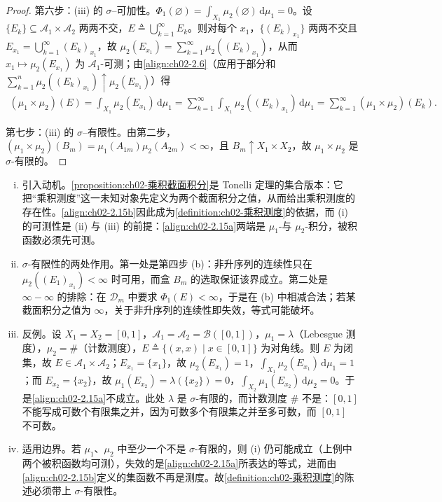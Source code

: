 \documentclass[../../main.tex]{subfiles}%
\begin{document}
\begin{proof}
第六步：(iii) 的 $\sigma$--可加性。$\Phi_1(\varnothing)=\int_{X_1}\mu_2(\varnothing)\,\mathrm{d}\mu_1=0$。设 $\{E_k\}\subseteq\mathscr A_1\times\mathscr A_2$ 两两不交，$E\triangleq\bigcup_{k=1}^\infty E_k$。则对每个 $x_1$，$\{(E_k)_{x_1}\}$ 两两不交且 $E_{x_1}=\bigcup_{k=1}^\infty(E_k)_{x_1}$，故 $\mu_2(E_{x_1})=\sum_{k=1}^\infty\mu_2((E_k)_{x_1})$，从而 $x_1\mapsto\mu_2(E_{x_1})$ 为 $\mathscr A_1$-可测；由\eqref{align:ch02-2.6}（应用于部分和 $\sum_{k=1}^n\mu_2((E_k)_{x_1})\uparrow\mu_2(E_{x_1})$）得
\begin{align*}
(\mu_1\times\mu_2)(E)=\int_{X_1}\mu_2(E_{x_1})\,\mathrm{d}\mu_1
=\sum_{k=1}^\infty\int_{X_1}\mu_2((E_k)_{x_1})\,\mathrm{d}\mu_1=\sum_{k=1}^\infty(\mu_1\times\mu_2)(E_k).
\end{align*}

第七步：(iii) 的 $\sigma$--有限性。由第二步，$(\mu_1\times\mu_2)(B_m)=\mu_1(A_{1m})\mu_2(A_{2m})<\infty$，且 $B_m\uparrow X_1\times X_2$，故 $\mu_1\times\mu_2$ 是 $\sigma$-有限的。
\end{proof}

\begin{remark}\label{remark:ch02-乘积截面积分动机}
\begin{enumerate}[(i)]
\item 引入动机。\cref{proposition:ch02-乘积截面积分}是 Tonelli 定理的集合版本：它把“乘积测度”这一未知对象先定义为两个截面积分之值，从而给出乘积测度的存在性。\eqref{align:ch02-2.15b}因此成为\cref{definition:ch02-乘积测度}的依据，而 (i) 的可测性是 (ii) 与 (iii) 的前提：\eqref{align:ch02-2.15a}两端是 $\mu_1$-与 $\mu_2$-积分，被积函数必须先可测。
\item $\sigma$-有限性的两处作用。第一处是第四步 (b)：非升序列的连续性只在 $\mu_2((E_1)_{x_1})<\infty$ 时可用，而盒 $B_m$ 的选取保证该界成立。第二处是 $\infty-\infty$ 的排除：在 $\mathscr D_m$ 中要求 $\Phi_1(E)<\infty$，于是在 (b) 中相减合法；若某截面积分之值为 $\infty$，关于非升序列的连续性即失效，等式可能破坏。
\item 反例。设 $X_1=X_2=[0,1]$，$\mathscr A_1=\mathscr A_2=\mathscr B([0,1])$，$\mu_1=\lambda$（Lebesgue 测度），$\mu_2=\#$（计数测度），$E\triangleq\{(x,x)\mid x\in[0,1]\}$ 为对角线。则 $E$ 为闭集，故 $E\in\mathscr A_1\times\mathscr A_2$；$E_{x_1}=\{x_1\}$，故 $\mu_2(E_{x_1})=1$，$\int_{X_1}\mu_2(E_{x_1})\,\mathrm{d}\mu_1=1$；而 $E_{x_2}=\{x_2\}$，故 $\mu_1(E_{x_2})=\lambda(\{x_2\})=0$，$\int_{X_2}\mu_1(E_{x_2})\,\mathrm{d}\mu_2=0$。于是\eqref{align:ch02-2.15a}不成立。此处 $\lambda$ 是 $\sigma$-有限的，而计数测度 $\#$ 不是：$[0,1]$ 不能写成可数个有限集之并，因为可数多个有限集之并至多可数，而 $[0,1]$ 不可数。
\item 适用边界。若 $\mu_1$、$\mu_2$ 中至少一个不是 $\sigma$-有限的，则 (i) 仍可能成立（上例中两个被积函数均可测），失效的是\eqref{align:ch02-2.15a}所表达的等式，进而由\eqref{align:ch02-2.15b}定义的集函数不再是测度。故\cref{definition:ch02-乘积测度}的陈述必须带上 $\sigma$-有限性。
\end{enumerate}
\end{remark}
\end{document}
